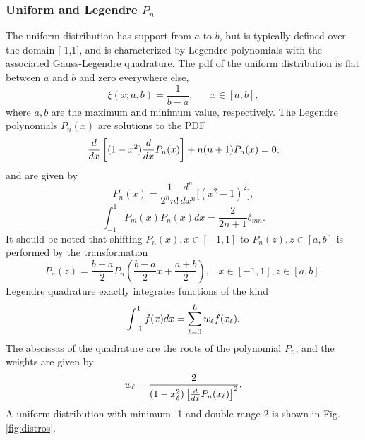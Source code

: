 \newpage
\subsubsection{Uniform and Legendre $P_n$}
The uniform distribution has support from $a$ to $b$, but is typically defined over the domain [-1,1], and is characterized by Legendre polynomials with the associated Gauss-Legendre quadrature.  The pdf of the uniform distribution is flat between $a$ and $b$ and zero everywhere else,
\begin{equation}
\xi(x;a,b)=\frac{1}{b-a},\hspace{20pt}x\in[a,b],
\end{equation}
where $a,b$ are the maximum and minimum value, respectively.  The Legendre polynomials $P_n(x)$ are solutions to the PDF
\begin{equation}
\frac{d }{d x}\left[(1-x^2)\frac{d }{d x}P_n(x)\right]+n(n+1)P_n(x)=0,
\end{equation}
and are given by
\begin{equation}
P_n(x)=\frac{1}{2^nn!}\frac{d^n}{dx^n}\big[(x^2-1)^2\big],
\end{equation}
\begin{equation}
\int_{-1}^{1} P_m(x)P_n(x)dx=\frac{2}{2n+1}\delta_{mn}.
\end{equation}
It should be noted that shifting $P_n(x),x\in[-1,1]$ to $P_n(z),z\in[a,b]$ is performed by the transformation
\begin{equation}
P_n(z)=\frac{b-a}{2}P_n\left(\frac{b-a}{2}x+\frac{a+b}{2}\right),\hspace{10pt}x\in[-1,1],z\in[a,b].
\end{equation}
Legendre quadrature exactly integrates functions of the kind
\begin{equation}
\int_{-1}^1 f(x)dx=\sum_{\ell=0}^L w_\ell f(x_\ell).
\end{equation}
The abscissas of the quadrature are the roots of the polynomial $P_n$, and the weights are given by
\begin{equation}
w_\ell=\frac{2}{(1-x_\ell^2)\left[\frac{d }{d x}P_n(x_\ell)\right]^2}.
\end{equation}
A uniform distribution with minimum -1 and double-range 2 is shown in Fig. \ref{fig:distros}.

\newpage
